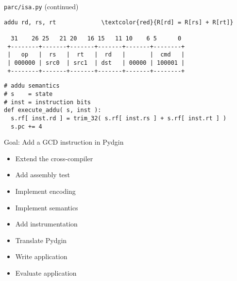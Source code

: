 
\begin{frame}[fragile]{\texttt{parc/isa.py} (continued)}

\begin{Verbatim}[commandchars=\\\{\}]
  addu rd, rs, rt             \textcolor{red}{R[rd] = R[rs] + R[rt]}

  31    26 25   21 20   16 15   11 10    6 5      0
 +--------+-------+-------+-------+-------+--------+
 |   op   |  rs   |  rt   |  rd   |       |  cmd   |
 | 000000 | src0  | src1  | dst   | 00000 | 100001 |
 +--------+-------+-------+-------+-------+--------+

\end{Verbatim}

\vspace{-40pt}

\begin{lstlisting}[numbers=none]
# addu semantics
# s    = state
# inst = instruction bits
def execute_addu( s, inst ):
  s.rf[ inst.rd ] = trim_32( s.rf[ inst.rs ] + s.rf[ inst.rt ] )
  s.pc += 4
\end{lstlisting}
\end{frame}


\begin{frame}{Goal: Add a GCD instruction in Pydgin}

\begin{itemize}
  \item Extend the cross-compiler
  \item Add assembly test
  \item Implement encoding
  \item Implement semantics
  \item Add instrumentation
  \item Translate Pydgin
  \item Write application
  \item Evaluate application
\end{itemize}

\end{frame}

